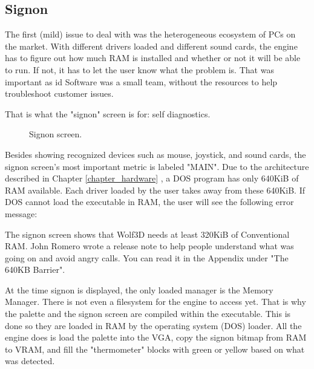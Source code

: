 \documentclass[book.tex]{subfiles}
\begin{document}
\subsection{Signon}
The first (mild) issue to deal with was the heterogeneous ecosystem of PCs on the market. With different drivers loaded and different sound cards, the engine has to figure out how much RAM is installed and whether or not it will be able to run. If not, it has to let the user know what the problem is. That was important as id Software was a small team, without the resources to help troubleshoot customer issues.\\
\par
That is what the "signon" screen is for: self diagnostics. 
\par
\begin{figure}[H]
\centering
{}
\caption{Signon screen.}
\end{figure}
\par
Besides showing recognized devices such as mouse, joystick, and sound cards, the signon screen's most important metric is labeled "MAIN". Due to the architecture described in Chapter \ref{chapter_hardware} , a DOS program has only 640KiB of RAM available. Each driver loaded by the user takes away from these 640KiB. If DOS cannot load the executable in RAM, the user will see the following error message:\\
\par 
\begin{minipage}{\textwidth}

\end{minipage}
\par
The signon screen shows that Wolf3D needs at least 320KiB of Conventional RAM. John Romero wrote a release note to help people understand what was going on and avoid angry calls. You can read it in the Appendix under "The 640KB Barrier".\\
\par 
At the time signon is displayed, the only loaded manager is the Memory Manager. There is not even a filesystem for the engine to access yet. That is why the palette and the signon screen are compiled within the executable. This is done so they are loaded in RAM by the operating system (DOS) loader. All the engine does is load the palette into the VGA, copy the signon bitmap from RAM to VRAM, and fill the "thermometer" blocks with green or yellow based on what was detected.\\
\par
\end{document}
